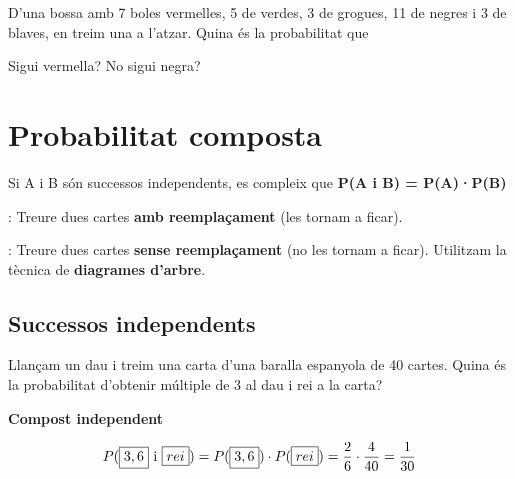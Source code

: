 \begin{mylist}

\exer  D'una bossa amb 7 boles vermelles, 5 de verdes, 3 de grogues, 11 de negres i 3 de blaves, en treim una a l'atzar. Quina és la probabilitat que 
\begin{tasks} 
	\task    Sigui vermella?    
	\task  No sigui negra?
\end{tasks}

\end{mylist}


\section{Probabilitat composta}

\begin{theorybox}

                      Si A i B són successos independents, es compleix que \textbf{P(A i B) = P(A)·P(B)                           }
                      
                      : Treure dues cartes\textbf{ amb reemplaçament} (les tornam a ficar).


                     : Treure dues cartes \textbf{sense reemplaçament} (no les tornam a ficar). Utilitzam la tècnica de    \textbf{ diagrames d'arbre}.
\end{theorybox}

\subsection{Successos independents}

\begin{resolt}[E]{
	
Llançam un dau i treim una carta d'una baralla espanyola de 40 cartes. Quina és la probabilitat d'obtenir múltiple de 3 al dau i rei a la carta?
	
}
	\textbf{Compost independent}

	\[P(\text{\boxed{3,6} i \boxed{rei}})= P(\text{\boxed{3,6}}) \cdot P(\text{\boxed{rei}}) = \frac{2}{6}\cdot \frac{4}{40}=\frac{1}{30} \]
	
\end{resolt}


